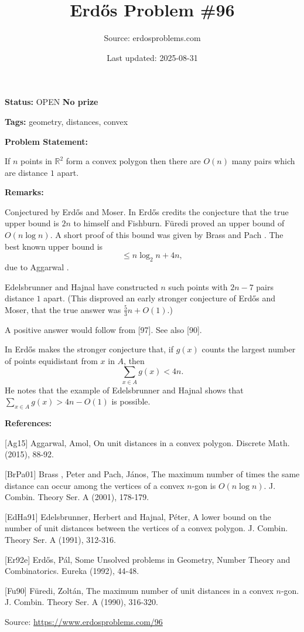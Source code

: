 \documentclass{article}
\title{Erd\H{o}s Problem \#96}
\date{Last updated: 2025-08-31}
\author{Source: erdosproblems.com}
\begin{document}
\maketitle

\noindent\textbf{Status:} OPEN \quad \textbf{No prize}

\noindent\textbf{Tags:} geometry, distances, convex

\medskip
\noindent\textbf{Problem Statement:}

If $n$ points in $\mathbb{R}^2$ form a convex polygon then there are $O(n)$ many pairs which are distance $1$ apart.

\bigskip
\noindent\textbf{Remarks:}

Conjectured by Erd\H{o}s and Moser. In \cite{Er92e} Erd\H{o}s credits the conjecture that the true upper bound is $2n$ to himself and Fishburn. F\"{u}redi \cite{Fu90} proved an upper bound of $O(n\log n)$. A short proof of this bound was given by Brass and Pach \cite{BrPa01}. The best known upper bound is\[\leq n\log_2n+4n,\]due to Aggarwal \cite{Ag15}.

Edelsbrunner and Hajnal \cite{EdHa91} have constructed $n$ such points with $2n-7$ pairs distance $1$ apart. (This disproved an early stronger conjecture of Erd\H{o}s and Moser, that the true answer was $\frac{5}{3}n+O(1)$.)

A positive answer would follow from [97]. See also [90].

In \cite{Er92e} Erd\H{o}s makes the stronger conjecture that, if $g(x)$ counts the largest number of points equidistant from $x$ in $A$, then\[\sum_{x\in A}g(x)< 4n.\]He notes that the example of Edelsbrunner and Hajnal shows that $\sum_{x\in A}g(x)>4n-O(1)$ is possible.

\bigskip
\noindent\textbf{References:}

[Ag15] Aggarwal, Amol, On unit distances in a convex polygon. Discrete Math. (2015), 88-92.
 
 [BrPa01] Brass , Peter and Pach, J\'{a}nos, The maximum number of times the same distance can occur among
the vertices of a convex {$n$}-gon is {$O(n\log n)$}. J. Combin. Theory Ser. A (2001), 178-179.
 
 [EdHa91] Edelsbrunner, Herbert and Hajnal, P\'{e}ter, A lower bound on the number of unit distances between the
vertices of a convex polygon. J. Combin. Theory Ser. A (1991), 312-316.
 
 [Er92e] Erd\H{o}s, P\'{a}l, Some Unsolved problems in Geometry, Number Theory and Combinatorics. Eureka (1992), 44-48.
 
 [Fu90] F\"{u}redi, Zolt\'{a}n, The maximum number of unit distances in a convex {$n$}-gon. J. Combin. Theory Ser. A (1990), 316-320.

\bigskip
\noindent\small{Source: \url{https://www.erdosproblems.com/96}}
\end{document}
